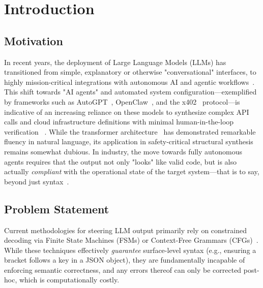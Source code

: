 \section{Introduction}

\subsection{Motivation}
In recent years, the deployment of Large Language Models (LLMs) has transitioned
from simple, explanatory or otherwise "conversational" interfaces, to highly
mission-critical integrations with autonomous AI and agentic workflows~\cite{autogpt2023}.
This shift towards "AI agents" and automated system configuration---exemplified
by frameworks such as AutoGPT~\cite{autogpt2023}, OpenClaw~\cite{openclaw2025}, and the x402~\cite{x4022025} protocol---is indicative
of an increasing reliance on these models to synthesize complex API calls and
cloud infrastructure definitions with minimal human-in-the-loop verification
~\cite{openclaw2025}. While the transformer architecture~\cite{vaswani2017attention} has demonstrated
remarkable fluency in natural language, its application in safety-critical
structural synthesis remains somewhat dubious. In industry, the move towards
fully autonomous agents requires that the output not only "looks" like valid
code, but is also actually \textit{compliant} with the operational state of the
target system---that is to say, beyond just syntax~\cite{poesia2022synchromesh}.

\subsection{Problem Statement}
Current methodologies for steering LLM output primarily rely on constrained
decoding via Finite State Machines (FSMs) or Context-Free Grammars
(CFGs)~\cite{poesia2022synchromesh}. While these techniques effectively \textit{guarantee}
surface-level syntax (e.g., ensuring a bracket follows a key in a JSON object),
they are fundamentally incapable of enforcing semantic correctness, and any
errors thereof can only be corrected post-hoc, which is computationally costly.

